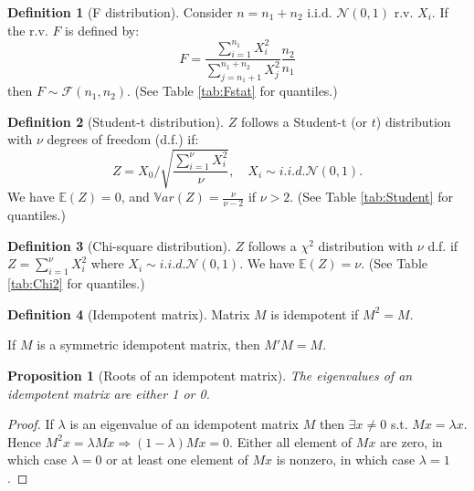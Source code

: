 \documentclass[
]{book}
\newtheorem{proposition}{Proposition}[chapter]
\theoremstyle{definition}
\newtheorem{definition}{Definition}[chapter]
\theoremstyle{definition}
\theoremstyle{definition}
\theoremstyle{definition}
\theoremstyle{remark}
\begin{document}
\begin{definition}[F distribution]
\protect\hypertarget{def:fstatistics}{}\label{def:fstatistics}Consider \(n=n_1+n_2\) i.i.d. \(\mathcal{N}(0,1)\) r.v. \(X_i\). If the r.v. \(F\) is defined by:
\[
F = \frac{\sum_{i=1}^{n_1} X_i^2}{\sum_{j=n_1+1}^{n_1+n_2} X_j^2}\frac{n_2}{n_1}
\]
then \(F \sim \mathcal{F}(n_1,n_2)\). (See Table \ref{tab:Fstat} for quantiles.)
\end{definition}

\begin{definition}[Student-t distribution]
\protect\hypertarget{def:tStudent}{}\label{def:tStudent}\(Z\) follows a Student-t (or \(t\)) distribution with \(\nu\) degrees of freedom (d.f.) if:
\[
Z = X_0 \bigg/ \sqrt{\frac{\sum_{i=1}^{\nu}X_i^2}{\nu}}, \quad X_i \sim i.i.d. \mathcal{N}(0,1).
\]
We have \(\mathbb{E}(Z)=0\), and \(\mathbb{V}ar(Z)=\frac{\nu}{\nu-2}\) if \(\nu>2\). (See Table \ref{tab:Student} for quantiles.)
\end{definition}

\begin{definition}[Chi-square distribution]
\protect\hypertarget{def:chi2}{}\label{def:chi2}\(Z\) follows a \(\chi^2\) distribution with \(\nu\) d.f. if \(Z = \sum_{i=1}^{\nu}X_i^2\) where \(X_i \sim i.i.d. \mathcal{N}(0,1)\).
We have \(\mathbb{E}(Z)=\nu\). (See Table \ref{tab:Chi2} for quantiles.)
\end{definition}

\begin{definition}[Idempotent matrix]
\protect\hypertarget{def:idempotent}{}\label{def:idempotent}Matrix \(M\) is idempotent if \(M^2=M\).

If \(M\) is a symmetric idempotent matrix, then \(M'M=M\).
\end{definition}

\begin{proposition}[Roots of an idempotent matrix]
\protect\hypertarget{prp:rootsidempotent}{}\label{prp:rootsidempotent}The eigenvalues of an idempotent matrix are either 1 or 0.
\end{proposition}

\begin{proof}
If \(\lambda\) is an eigenvalue of an idempotent matrix \(M\) then \(\exists x \ne 0\) s.t. \(Mx=\lambda x\). Hence \(M^2x=\lambda M x \Rightarrow (1-\lambda)Mx=0\). Either all element of \(Mx\) are zero, in which case \(\lambda=0\) or at least one element of \(Mx\) is nonzero, in which case \(\lambda=1\).
\end{proof}
\end{document}
